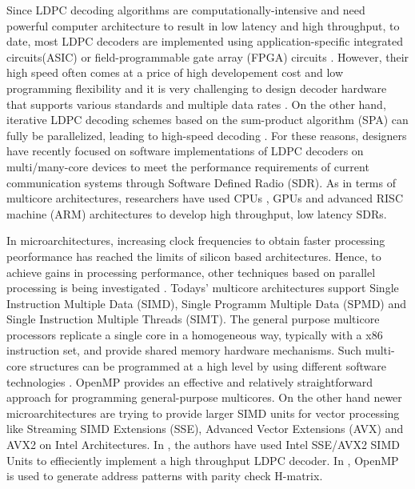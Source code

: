 \documentclass[conference]{IEEEtran}
\begin{document}
Since LDPC decoding algorithms are computationally-intensive and need powerful computer architecture to result in low latency and high throughput, to date, most LDPC decoders are implemented using application-specific integrated circuits(ASIC) or field-programmable gate array (FPGA) circuits \cite{art_ldpc_OpenCl_1}. However, their high speed often comes at a price of high developement cost and low programming flexibility \cite{art_convolutional} and it is very challenging to design decoder hardware that supports various standards and multiple data rates \cite{art_cuda_openmp}. On the other hand, iterative LDPC decoding schemes based on the sum-product algorithm (SPA) can fully be parallelized, leading to high-speed decoding \cite{art_shannon}. For these reasons, designers have recently focused on software implementations of LDPC decoders on multi/many-core devices \cite{art_massively} to meet the performance requirements of current communication systems through Software Defined Radio (SDR). As in terms of multicore architectures, researchers have used CPUs \cite{art_cpu_gpu, art_ldpc_cpu0}, GPUs \cite{art_memory_coalesced, art_massively, art_optimize_0} and advanced RISC machine (ARM) \cite{art_ldpc_cpu0, art_neon} architectures to develop high throughput, low latency SDRs. 

In microarchitectures, increasing clock frequencies to obtain faster processing peorformance has reached the limits of silicon based architectures. Hence, to achieve gains in processing performance, other techniques based on parallel processing is being investigated \cite{art_ldpc_cpu1}. Todays' multicore architectures support Single Instruction Multiple Data (SIMD), Single Programm Multiple Data (SPMD) and Single Instruction Multiple Threads (SIMT). The general purpose multicore processors replicate a single core in a homogeneous way, typically with a x86 instruction set, and provide shared memory hardware mechanisms\cite{art_massively}. Such multi-core structures can be programmed at a high level by using different software technologies \cite{art_multicore_techs}. OpenMP \cite{art_openMp_book} provides an effective and relatively straightforward approach for programming general-purpose multicores. On the other hand newer microarchitectures are trying to provide larger SIMD units for vector processing like Streaming SIMD Extensions (SSE), Advanced Vector Extensions (AVX) and AVX2 \cite{art_intel_sse} on Intel Architectures. In \cite{art_ldpc_cpu1}, the authors have used Intel SSE/AVX2 SIMD Units to effieciently implement a high throughput LDPC decoder. In \cite{art_cuda_openmp}, OpenMP is used to generate address patterns with parity check H-matrix.
\end{document}
